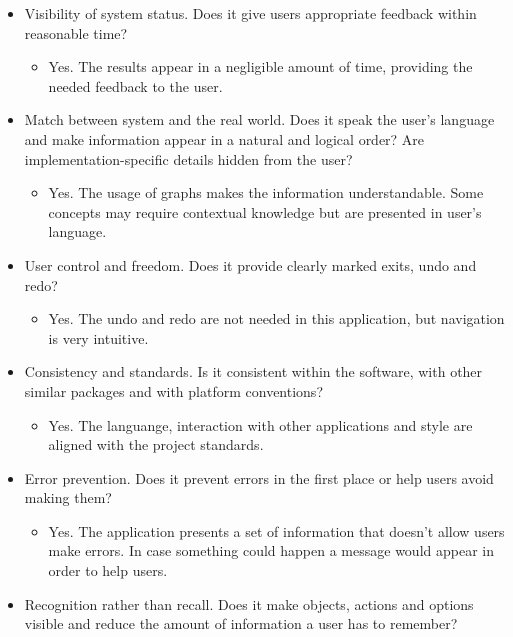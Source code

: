 \begin{itemize}
\itemsep1pt\parskip0pt
\item
  Visibility of system status. Does it give users appropriate feedback
  within reasonable time?

  \begin{itemize}
  \itemsep1pt\parskip0pt
  \item
    Yes. The results appear in a negligible amount of time, providing
    the needed feedback to the user.
  \end{itemize}
\item
  Match between system and the real world. Does it speak the user's
  language and make information appear in a natural and logical order?
  Are implementation-specific details hidden from the user?

  \begin{itemize}
  \itemsep1pt\parskip0pt
  \item
    Yes. The usage of graphs makes the information understandable. Some
    concepts may require contextual knowledge but are presented in
    user's language.
  \end{itemize}
\item
  User control and freedom. Does it provide clearly marked exits, undo
  and redo?

  \begin{itemize}
  \itemsep1pt\parskip0pt
  \item
    Yes. The undo and redo are not needed in this application, but
    navigation is very intuitive.
  \end{itemize}
\item
  Consistency and standards. Is it consistent within the software, with
  other similar packages and with platform conventions?

  \begin{itemize}
  \itemsep1pt\parskip0pt
  \item
    Yes. The languange, interaction with other applications and style
    are aligned with the project standards.
  \end{itemize}
\item
  Error prevention. Does it prevent errors in the first place or help
  users avoid making them?

  \begin{itemize}
  \itemsep1pt\parskip0pt
  \item
    Yes. The application presents a set of information that doesn't
    allow users make errors. In case something could happen a message
    would appear in order to help users.
  \end{itemize}
\item
  Recognition rather than recall. Does it make objects, actions and
  options visible and reduce the amount of information a user has to
  remember?


\end{itemize}
